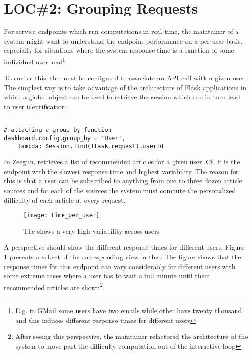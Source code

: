 
\section{LOC\#2: Grouping Requests}
\label{sec:user}

For service endpoints which run computations in real time, the maintainer of a system might want to understand the endpoint performance on a per-user basis, especially for situations where the system response time is a function of some individual user load\footnote{E.g. in GMail some users have two emails while other have twenty thousand and this induces different response times for different users}.

To enable this, the \tool must be configured to associate an API call with a given user. The simplest way is to take advantage of the architecture of Flask applications in which a global  object can be used to retrieve the session which can in turn lead to user identification: 

\begin{lstlisting}[style=custompython]  

# attaching a group by function 
dashboard.config.group_by = 'User',
	lambda: Session.find(flask.request).userid

\end{lstlisting}



In Zeeguu, \epFeedItems retrieves a list of recommended articles for a given user. Cf.  it is the endpoint with the slowest response time and highest variability. The reason for this is that a user can be subscribed to anything from one to three dozen article sources and for each of the sources the system must compute the personalized difficulty of each article at every request. 


\begin{figure}[h!]
  \centering
  \texttt{[image: time\_per\_user]}
  \caption{The \epFeedItems shows a very high variability across users}
  \label{fig:tpu}
\end{figure}


A  perspective should show the different response times for different users. Figure \ref{fig:tpu} presents a subset of the corresponding view in the \tool. The figure shows that the response times for this endpoint can vary considerably for different users with some extreme cases where a user has to wait a full minute until their recommended articles are shown\footnote{After seeing this perspective, the maintainer refactored the architecture of the system to move part the difficulty computation out of the interactive loop}.






